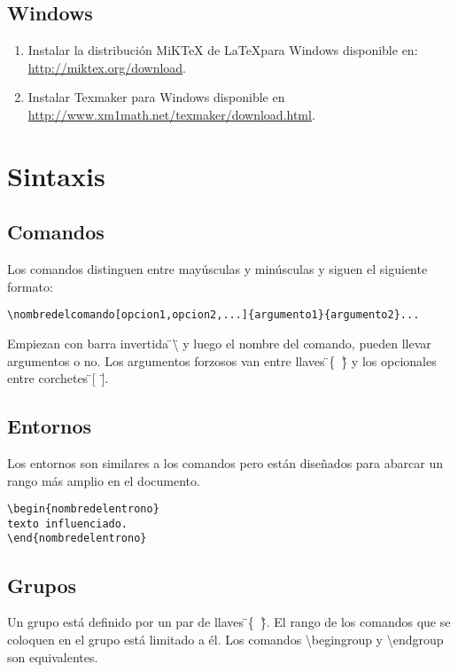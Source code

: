 \documentclass[12pt, a4paper,twoside]{article} %
\begin{document}
\subsection{Windows}
\begin{enumerate}
\item Instalar la distribución MiKTeX de \LaTeX para Windows disponible en: \url{http://miktex.org/download}.
\item Instalar Texmaker para Windows disponible en \url{http://www.xm1math.net/texmaker/download.html}.
\end{enumerate}

\section{Sintaxis}

\subsection{Comandos}

Los comandos distinguen entre mayúsculas y minúsculas y siguen el siguiente formato: 

\begin{center}
\lstinline!\nombredelcomando[opcion1,opcion2,...]{argumento1}{argumento2}...!
\end{center}

Empiezan con barra invertida \"{}\textbackslash{}\"{} y luego el nombre del comando, pueden llevar argumentos o no. Los argumentos forzosos van entre llaves \"{}\{~\}\"{} y los opcionales entre corchetes \"{}[~]\"{}.

\subsection{Entornos}

Los entornos son similares a los comandos pero están diseñados para abarcar un rango más amplio en el documento.

\begin{lstlisting}
\begin{nombredelentrono}
texto influenciado.
\end{nombredelentrono}
\end{lstlisting}

\subsection{Grupos}

Un grupo está definido por un par de llaves \"{}\{~\}\"{}. El rango de los comandos que se coloquen en el grupo está limitado a él. Los comandos \textbackslash{}begingroup y \textbackslash{}endgroup son equivalentes. 
\end{document}
